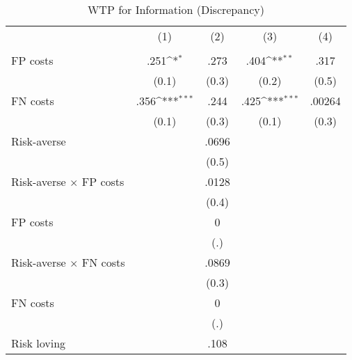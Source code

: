 \begin{table}[htbp]\centering
\scriptsize
\def\sym#1{\ifmmode^{#1}\else\(^{#1}\)\fi}
\caption{WTP for Information (Discrepancy)}
\begin{tabular}{l*{4}{c}}
\hline\hline
                &\multicolumn{1}{c}{(1)}&\multicolumn{1}{c}{(2)}&\multicolumn{1}{c}{(3)}&\multicolumn{1}{c}{(4)}\\
                &\multicolumn{1}{c}{}&\multicolumn{1}{c}{}&\multicolumn{1}{c}{}&\multicolumn{1}{c}{}\\
\hline
FP costs        &     .251\sym{*}  &     .273         &     .404\sym{**} &     .317         \\
                &    (0.1)         &    (0.3)         &    (0.2)         &    (0.5)         \\
FN costs        &     .356\sym{***}&     .244         &     .425\sym{***}&   .00264         \\
                &    (0.1)         &    (0.3)         &    (0.1)         &    (0.3)         \\
Risk-averse     &                  &    .0696         &                  &                  \\
                &                  &    (0.5)         &                  &                  \\
Risk-averse $\times$ FP costs&                  &    .0128         &                  &                  \\
                &                  &    (0.4)         &                  &                  \\
FP costs        &                  &        0         &                  &                  \\
                &                  &      (.)         &                  &                  \\
Risk-averse $\times$ FN costs&                  &    .0869         &                  &                  \\
                &                  &    (0.3)         &                  &                  \\
FN costs        &                  &        0         &                  &                  \\
                &                  &      (.)         &                  &                  \\
Risk loving     &                  &     .108         &                  &                  \\

\end{tabular}
\end{table}
